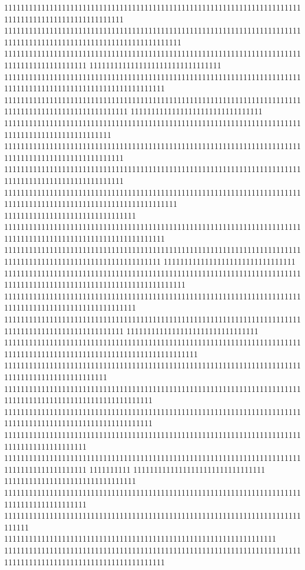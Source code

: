 11111111111111111111111111111111111111111111111111111111111111111111111111111111111111111111111111111
1111111111111111111111111111111111111111111111111111111111111111111111111111111111111111111111111111111111111111111
11111111111111111111111111111111111111111111111111111111111111111111111111111111111111111111
11111111111111111111111111111111
111111111111111111111111111111111111111111111111111111111111111111111111111111111111111111111111111111111111111
111111111111111111111111111111111111111111111111111111111111111111111111111111111111111111111111111111
11111111111111111111111111111111
11111111111111111111111111111111111111111111111111111111111111111111111111111111111111111111111111
11111111111111111111111111111111111111111111111111111111111111111111111111111111111111111111111111111
11111111111111111111111111111111111111111111111111111111111111111111111111111111111111111111111111111
111111111111111111111111111111111111111111111111111111111111111111111111111111111111111111111111111111111111111111
11111111111111111111111111111111
111111111111111111111111111111111111111111111111111111111111111111111111111111111111111111111111111111111111111
11111111111111111111111111111111111111111111111111111111111111111111111111111111111111111111111111111111111111
11111111111111111111111111111111
11111111111111111111111111111111111111111111111111111111111111111111111111111111111111111111111111111111111111111111
11111111111111111111111111111111111111111111111111111111111111111111111111111111111111111111111111111111
11111111111111111111111111111111111111111111111111111111111111111111111111111111111111111111111111111
11111111111111111111111111111111
11111111111111111111111111111111111111111111111111111111111111111111111111111111111111111111111111111111111111111111111
1111111111111111111111111111111111111111111111111111111111111111111111111111111111111111111111111
111111111111111111111111111111111111111111111111111111111111111111111111111111111111111111111111111111111111
111111111111111111111111111111111111111111111111111111111111111111111111111111111111111111111111111111111111
11111111111111111111111111111111111111111111111111111111111111111111111111111111111111111111
11111111111111111111111111111111111111111111111111111111111111111111111111111111111111111111
1111111111
11111111111111111111111111111111
11111111111111111111111111111111
11111111111111111111111111111111111111111111111111111111111111111111111111111111111111111111
111111111111111111111111111111111111111111111111111111111111111111111111111111
111111111111111111111111111111111111111111111111111111111111111111
111111111111111111111111111111111111111111111111111111111111111111111111111111111111111111111111111111111111111
